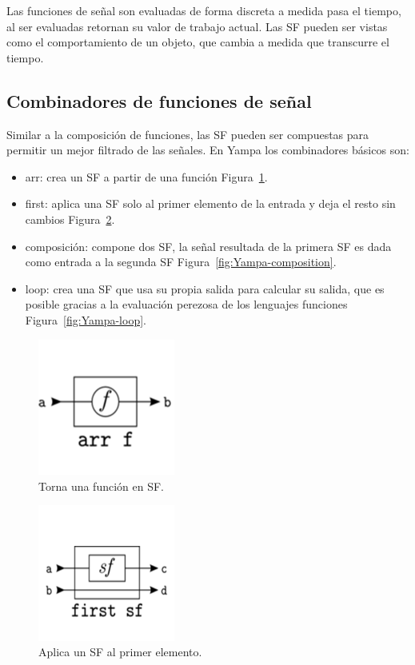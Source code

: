 Las funciones de señal son evaluadas de forma discreta a medida pasa el tiempo, al ser evaluadas retornan su valor de trabajo actual. Las SF pueden ser vistas como el comportamiento de un objeto, que cambia a medida que transcurre el tiempo.

\subsection{Combinadores de funciones de señal}

Similar a la composición de funciones, las SF pueden ser compuestas para permitir un mejor filtrado de las señales. En Yampa los combinadores básicos son:

\begin{itemize}
\item arr: crea un SF a partir de una función Figura~\ref{fig:Yampa-arr}.
\item first: aplica una SF solo al primer elemento de la entrada y deja el resto sin cambios Figura~\ref{fig:Yampa-first}.
\item composición: compone dos SF, la señal resultada de la primera SF es dada como entrada a la segunda SF Figura~\ref{fig:Yampa-composition}.
\item loop: crea una SF que usa su propia salida para calcular su salida, que es posible gracias a la evaluación perezosa de los lenguajes funciones Figura~\ref{fig:Yampa-loop}.
\end{itemize}


\begin{figure}[htbp!]
\centering
\includegraphics[width=0.4\textwidth]{Yampa-arr}
\caption[Yampa-arr]{Torna una función en SF.}
\label{fig:Yampa-arr}
\end{figure}

\begin{figure}[htbp!]
\centering
\includegraphics[width=0.4\textwidth]{Yampa-first}
\caption[Yampa-first]{Aplica un SF al primer elemento.}
\label{fig:Yampa-first}
\end{figure}

